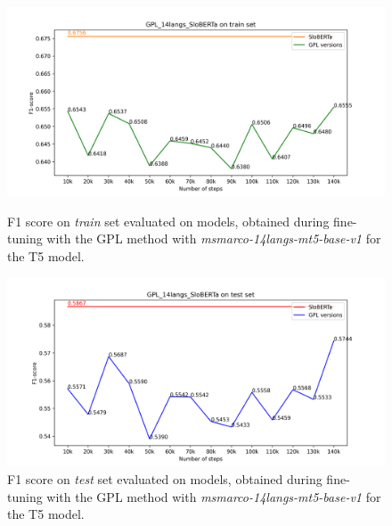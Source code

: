 \documentclass[fleqn,moreauthors,10pt]{ds_report}
\begin{document}
\begin{figure}
    \centering
    \begin{minipage}{0.5\textwidth}
        \centering
        \includegraphics[width=\linewidth]{graphs/GPL_14langs_SloBERTa_train.png}
        \caption{F1 score on \textit{train} set evaluated on models, obtained during fine-tuning with the GPL method with {\it msmarco-14langs-mt5-base-v1} \cite{msmarco14langs} for the T5 model.}
		\label{fig:gpl-sloberta-versions-train}
    \end{minipage}\hfill
    \begin{minipage}{0.5\textwidth}
        \centering
        \includegraphics[width=\linewidth]{graphs/GPL_14langs_SloBERTa_test.png}
        \caption{F1 score on \textit{test} set evaluated on models, obtained during fine-tuning with the GPL method with {\it msmarco-14langs-mt5-base-v1} \cite{msmarco14langs} for the T5 model.}
		\label{fig:gpl-sloberta-versions}
    \end{minipage}
\end{figure}
\end{document}
